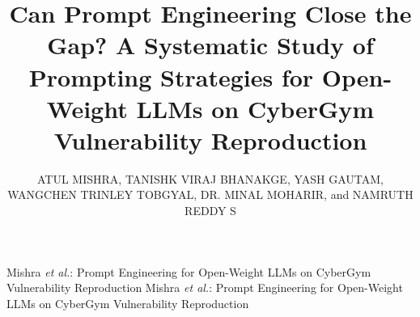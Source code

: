 \documentclass{ieeeaccess}
\begin{document}

\title{Can Prompt Engineering Close the Gap? A Systematic Study of Prompting Strategies for Open-Weight LLMs on CyberGym Vulnerability Reproduction}

\author{\uppercase{Atul Mishra},
\uppercase{Tanishk Viraj Bhanakge},
\uppercase{Yash Gautam},
\uppercase{Wangchen Trinley Tobgyal},
\uppercase{Dr. Minal Moharir}, and
\uppercase{Namruth Reddy S}}
\address[1]{Department of Computer Science and Engineering, SRM Institute of Science and Technology, Kattankulathur, Tamil Nadu, India (e-mail: am6587@srmist.edu.in)}
\address[2]{Department of Computer Science and Engineering (Cyber Security), RV College of Engineering\textsuperscript{\textregistered}, Bengaluru, India (e-mail: \{tanishkv.cy23, yashgautam.cy23, wangchentrinleyt.cy23, minalmoharir\}@rvce.edu.in)}
\address[3]{NVIDIA Corporation, Santa Clara, CA, USA (e-mail: reddynamruth@gmail.com)}


\markboth
{Mishra \MakeLowercase{\textit{et al.}}: Prompt Engineering for Open-Weight LLMs on CyberGym Vulnerability Reproduction}
{Mishra \MakeLowercase{\textit{et al.}}: Prompt Engineering for Open-Weight LLMs on CyberGym Vulnerability Reproduction}

\end{document}
